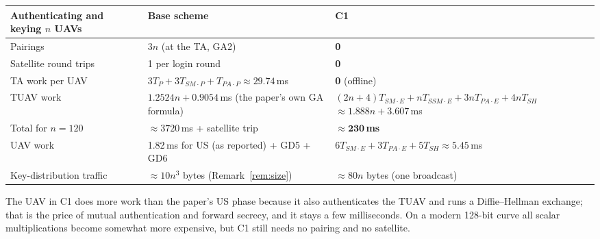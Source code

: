 \begin{center}
\small
\begin{tabularx}{\linewidth}{@{}p{3.3cm} X X@{}}
\toprule
\textbf{Authenticating and keying $n$ UAVs} & \textbf{Base scheme} & \textbf{C1}\\
\midrule
Pairings & $3n$ (at the TA, GA2) & \textbf{0}\\
Satellite round trips & 1 per login round & \textbf{0}\\
TA work per UAV & $3T_P+3T_{SM\cdot P}+T_{PA\cdot P}\approx29.74$\,ms & \textbf{0} (offline)\\
TUAV work & $1.2524n+0.9054$\,ms (the paper's own GA formula) & $(2n{+}4)T_{SM\cdot E}+nT_{SSM\cdot E}+3nT_{PA\cdot E}+4nT_{SH}$
$\approx1.888n+3.607$\,ms\\
Total for $n=120$ & $\approx3720$\,ms + satellite trip & $\approx\mathbf{230}$\,\textbf{ms}\\
UAV work & 1.82\,ms for US (as reported) + GD5 + GD6 & $6T_{SM\cdot E}+3T_{PA\cdot E}+5T_{SH}\approx5.45$\,ms\\
Key-distribution traffic & $\approx10n^3$ bytes (Remark~\ref{rem:size}) & $\approx80n$ bytes (one broadcast)\\
\bottomrule
\end{tabularx}
\end{center}
The UAV in C1 does more work than the paper's US phase because it also authenticates the TUAV and runs a Diffie--Hellman exchange; that is the price of
mutual authentication and forward secrecy, and it stays a few milliseconds. On a modern 128-bit curve all scalar multiplications become somewhat more
expensive, but C1 still needs no pairing and no satellite.

